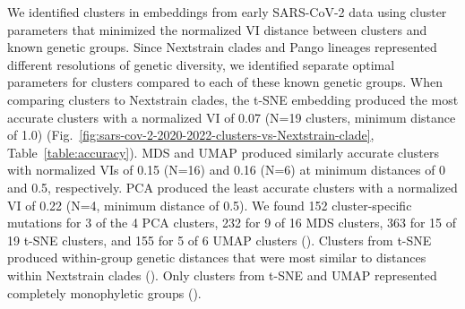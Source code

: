 \documentclass[10pt,letterpaper]{article}
\begin{document}
We identified clusters in embeddings from early SARS-CoV-2 data using cluster parameters that minimized the normalized VI distance between clusters and known genetic groups.
Since Nextstrain clades and Pango lineages represented different resolutions of genetic diversity, we identified separate optimal parameters for clusters compared to each of these known genetic groups.
When comparing clusters to Nextstrain clades, the t-SNE embedding produced the most accurate clusters with a normalized VI of 0.07 (N=19 clusters, minimum distance of 1.0) (Fig.~\ref{fig:sars-cov-2-2020-2022-clusters-vs-Nextstrain-clade}, Table~\ref{table:accuracy}).
MDS and UMAP produced similarly accurate clusters with normalized VIs of 0.15 (N=16) and 0.16 (N=6) at minimum distances of 0 and 0.5, respectively.
PCA produced the least accurate clusters with a normalized VI of 0.22 (N=4, minimum distance of 0.5).
We found 152 cluster-specific mutations for 3 of the 4 PCA clusters, 232 for 9 of 16 MDS clusters, 363 for 15 of 19 t-SNE clusters, and 155 for 5 of 6 UMAP clusters ().
Clusters from t-SNE produced within-group genetic distances that were most similar to distances within Nextstrain clades ().
Only clusters from t-SNE and UMAP represented completely monophyletic groups ().
\end{document}

